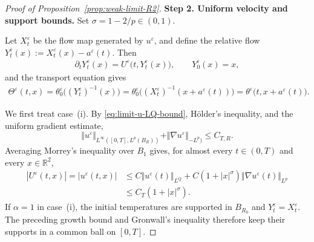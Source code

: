 \documentclass[reqno,11pt,a4paper]{amsart}
\begin{document}
\begin{proof}[Proof of Proposition~\ref{prop:weak-limit-R2}]

\medskip
\noindent\textbf{Step 2. Uniform velocity and support bounds.}
Set $\sigma=1-2/p\in(0,1)$.

Let $X_t^\varepsilon$ be the flow map generated by $u^\varepsilon$, and
define the relative flow $Y_t^\varepsilon(x) := X_t^\varepsilon(x)-a^\varepsilon(t)$.
Then 
\begin{align*}
  \partial_tY_t^\varepsilon(x) = U^\varepsilon\bigl(t,Y_t^\varepsilon(x)\bigr),
  \qquad Y_0^\varepsilon(x)=x,
\end{align*}
and the transport equation gives 
\begin{align}\label{eq:Theta-eps-exp}
  \Theta^\varepsilon(t,x) = \theta_0^\varepsilon \bigl((Y_t^\varepsilon)^{-1}(x)\bigr) 
  = \theta_0^\varepsilon \big((X_t^\varepsilon)^{-1} (x + a^\varepsilon(t)) \big) = \theta^\varepsilon \big(t, x + a^\varepsilon(t) \big).
\end{align}

We first treat case~(i).
By \eqref{eq:limit-u-LQ-bound}, H\"older's inequality,
and the uniform gradient estimate,
\[
  \Vert u^\varepsilon\Vert _{L^\infty([0,T],L^p(B_R))}
  +\Vert \nabla u^\varepsilon\Vert _{-L^p)}
  \leq C_{T,R}.
\]
Averaging Morrey's inequality over $B_1$ gives,
for almost every $t\in(0,T)$ and every $x\in\mathbb R^2$,
\begin{align*}
  |U^\varepsilon(t,x)|
  =|u^\varepsilon(t,x)|
  &\leq C\Vert u^\varepsilon(t)\Vert _{L^Q}
    +C(1+|x|^\sigma)
      \Vert \nabla u^\varepsilon(t)\Vert _{L^p}
  \\
  &\leq C_T(1+|x|^\sigma).
\end{align*}
If $\alpha=1$ in case~(i), the initial temperatures
are supported in $B_{R_0}$ and $Y_t^\varepsilon=X_t^\varepsilon$.
The preceding growth bound and Gronwall's inequality
therefore keep their supports in a common ball on $[0,T]$.


\end{proof}
\end{document}
